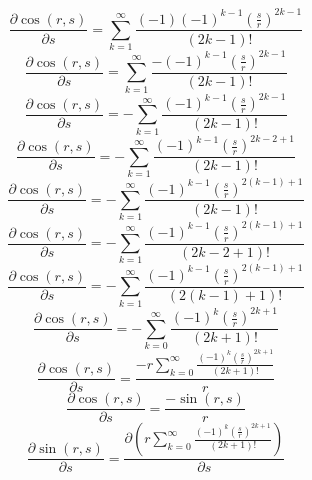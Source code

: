 \documentclass[a4paper,12pt]{report}
\begin{document}
\begin{equation}
\frac{\partial \cos(r,s)}{\partial s} = \sum \limits_{k=1}^{\infty} \frac{(-1)(-1)^{k-1} \left(\frac{s}{r}\right)^{2k-1}}{(2k-1)!}
\end{equation}
\begin{equation}
\frac{\partial \cos(r,s)}{\partial s} = \sum \limits_{k=1}^{\infty} \frac{-(-1)^{k-1} \left(\frac{s}{r}\right)^{2k-1}}{(2k-1)!}
\end{equation}
\begin{equation}
\frac{\partial \cos(r,s)}{\partial s} = -\sum \limits_{k=1}^{\infty} \frac{(-1)^{k-1} \left(\frac{s}{r}\right)^{2k-1}}{(2k-1)!}
\end{equation}
\begin{equation}
\frac{\partial \cos(r,s)}{\partial s} = -\sum \limits_{k=1}^{\infty} \frac{(-1)^{k-1} \left(\frac{s}{r}\right)^{2k-2+1}}{(2k-1)!}
\end{equation}
\begin{equation}
\frac{\partial \cos(r,s)}{\partial s} = -\sum \limits_{k=1}^{\infty} \frac{(-1)^{k-1} \left(\frac{s}{r}\right)^{2(k-1)+1}}{(2k-1)!}
\end{equation}
\begin{equation}
\frac{\partial \cos(r,s)}{\partial s} = -\sum \limits_{k=1}^{\infty} \frac{(-1)^{k-1} \left(\frac{s}{r}\right)^{2(k-1)+1}}{(2k-2+1)!}
\end{equation}
\begin{equation}
\frac{\partial \cos(r,s)}{\partial s} = -\sum \limits_{k=1}^{\infty} \frac{(-1)^{k-1} \left(\frac{s}{r}\right)^{2(k-1)+1}}{(2(k-1)+1)!}
\end{equation}
\begin{equation}
\frac{\partial \cos(r,s)}{\partial s} = -\sum \limits_{k=0}^{\infty} \frac{(-1)^k \left(\frac{s}{r}\right)^{2k+1}}{(2k+1)!}
\end{equation}
\begin{equation}
\frac{\partial \cos(r,s)}{\partial s} = \frac{-r \sum \limits_{k=0}^{\infty} \frac{(-1)^k \left(\frac{s}{r}\right)^{2k+1}}{(2k+1)!}}{r}
\end{equation}
\begin{equation}
\frac{\partial \cos(r,s)}{\partial s} = \frac{-\sin(r,s)}{r}
\end{equation}
\begin{equation}
\frac{\partial \sin(r,s)}{\partial s} = \frac{\partial \left(r \sum \limits_{k=0}^{\infty} \frac{(-1)^k \left(\frac{s}{r}\right)^{2k+1}}{(2k+1)!}\right)}{\partial s}
\end{equation}
\end{document}
